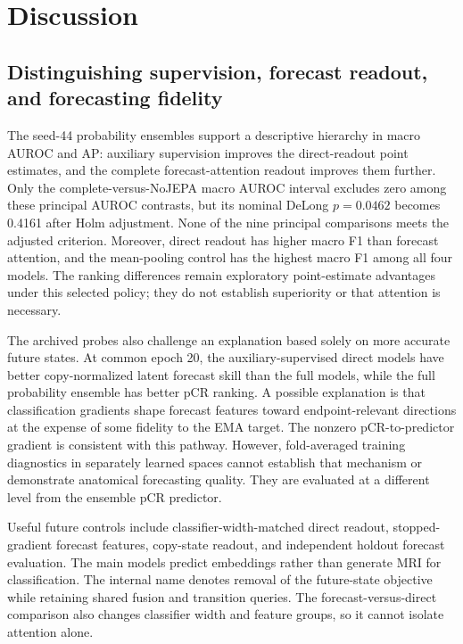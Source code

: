 \section{Discussion}
\label{sec:discussion}
\subsection{Distinguishing supervision, forecast readout, and forecasting fidelity}
The seed-44 probability ensembles support a descriptive hierarchy in macro AUROC and AP: auxiliary supervision improves the direct-readout point estimates, and the complete forecast-attention readout improves them further. Only the complete-versus-NoJEPA macro AUROC interval excludes zero among these principal AUROC contrasts, but its nominal DeLong $p=0.0462$ becomes 0.4161 after Holm adjustment. None of the nine principal comparisons meets the adjusted criterion. Moreover, direct readout has higher macro F1 than forecast attention, and the mean-pooling control has the highest macro F1 among all four models. The ranking differences remain exploratory point-estimate advantages under this selected policy; they do not establish superiority or that attention is necessary.

The archived probes also challenge an explanation based solely on more accurate future states. At common epoch 20, the auxiliary-supervised direct models have better copy-normalized latent forecast skill than the full models, while the full probability ensemble has better pCR ranking. A possible explanation is that classification gradients shape forecast features toward endpoint-relevant directions at the expense of some fidelity to the EMA target. The nonzero pCR-to-predictor gradient is consistent with this pathway. However, fold-averaged training diagnostics in separately learned spaces cannot establish that mechanism or demonstrate anatomical forecasting quality. They are evaluated at a different level from the ensemble pCR predictor.

Useful future controls include classifier-width-matched direct readout, stopped-gradient forecast features, copy-state readout, and independent holdout forecast evaluation. The main models predict embeddings rather than generate MRI for classification. The internal name \nojepa{} denotes removal of the future-state objective while retaining shared fusion and transition queries. The forecast-versus-direct comparison also changes classifier width and feature groups, so it cannot isolate attention alone.

